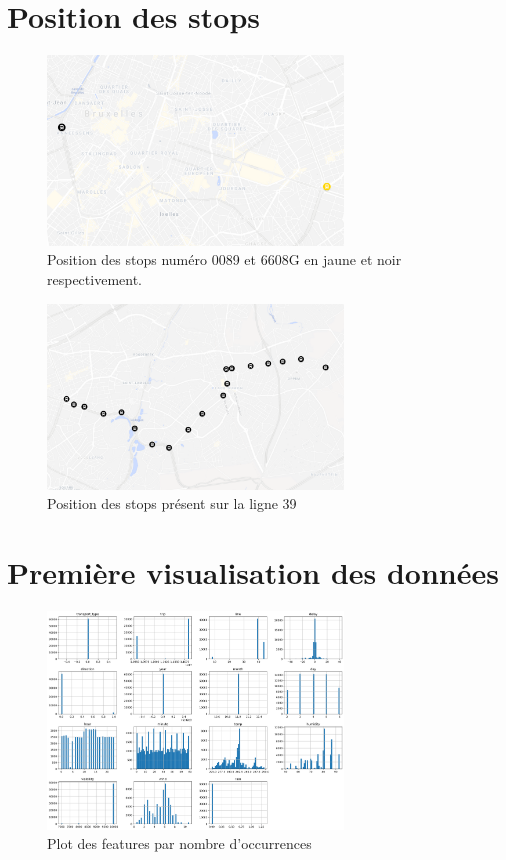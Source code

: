 \begin{appendices}
    \chapter{Position des stops}
    \begin{figure}[ht]
        \centering
        \includegraphics[width=0.7\textwidth]{images/stop_pos_1.png}
        \caption{Position des stops numéro 0089 et 6608G en jaune et noir respectivement.}
        \label{appendix:stop_pos_1}
    \end{figure}

    \begin{figure}[ht]
        \centering
        \includegraphics[width=0.7\textwidth]{images/stop_pos_2.png}
        \caption{Position des stops présent sur la ligne 39}
        \label{appendix:stop_pos_2}
    \end{figure}

    \chapter{Première visualisation des données}
    \begin{figure}[ht]
        \centering
        \includegraphics[width=0.7\textwidth]{images/plots.png}
        \caption{Plot des features par nombre d'occurrences}
        \label{appendix:plots}
    \end{figure}


\end{appendices}
